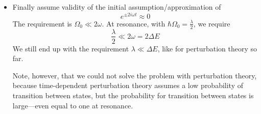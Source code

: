 \documentclass[11pt, a4paper]{article}
\begin{document}
\begin{itemize}
	\item Finally assume validity of the initial assumption/approximation of 
	\begin{equation*}
		e^{\pm 2i\omega t} \approx 0
	\end{equation*}
	The requirement is $ \Omega_{0} \ll 2 \omega $. At resonance, with $ 	\hbar \Omega_{0} = \frac{\lambda}{2} $, we require
	\begin{equation*}
		\frac{\lambda}{2} \ll 2 \omega = 2 \Delta E
	\end{equation*}
	We still end up with the requirement $ \lambda \ll \Delta E $, like for perturbation theory so far.
	
	Note, however, that we could not solve the problem with perturbation theory, because time-dependent perturbation theory assumes a low probability of transition between states, but the probability for transition between states is large---even equal to one at resonance.
	
    
	
\end{itemize}
\end{document}
